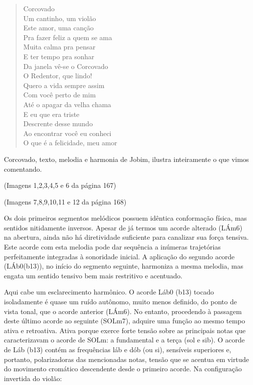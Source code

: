 \begin{verse}
Corcovado\\
Um cantinho, um violão\\
Este amor, uma canção\\
Pra fazer feliz a quem se ama\\
Muita calma pra pensar\\
E ter tempo pra sonhar\\
Da janela vê-se o Corcovado\\
O Redentor, que lindo!\\
Quero a vida sempre assim\\
Com você perto de mim\\
Até o apagar da velha chama\\
E eu que era triste\\
Descrente desse mundo\\
Ao encontrar você eu conheci\\
O que é a felicidade, meu amor
\end{verse}

Corcovado, texto, melodia e harmonia de Jobim, ilustra inteiramente o
que vimos comentando.

(Imagens 1,2,3,4,5 e 6 da página 167)

(Imagens 7,8,9,10,11 e 12 da página 168)

Os dois primeiros segmentos melódicos possuem idêntica conformação
física, mas sentidos nitidamente inversos. Apesar de já termos um acorde
alterado (LÁm6) na abertura, ainda não há diretividade suficiente para
canalizar sua força tensiva. Este acorde com esta melodia pode dar
sequência a inúmeras trajetórias perfeitamente integradas à sonoridade
inicial. A aplicação do segundo acorde (LÁb0(b13)), no início do
segmento seguinte, harmoniza a mesma melodia, mas engata um sentido
tensivo bem mais restritivo e acentuado.

Aqui cabe um esclarecimento harmônico. O acorde Láb0 (b13) tocado
isoladamente é quase um ruído autônomo, muito menos definido, do ponto
de vista tonal, que o acorde anterior (LÁm6). No entanto, procedendo à
passagem deste último acorde ao seguinte (SOLm7), adquire uma função ao
mesmo tempo ativa e retroativa. Ativa porque exerce forte tensão sobre
as principais notas que caracterizavam o acorde de SOLm: a fundamental e
a terça (sol e sib). O acorde de Láb (b13) contém as frequências láb e
dób (ou si), sensíveis superiores e, portanto, polarizadoras das
mencionadas notas, tensão que se acentua em virtude do movimento
cromático descendente desde o primeiro acorde. Na configuração invertida
do violão:

